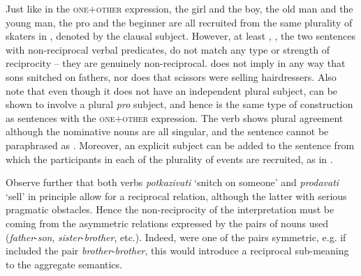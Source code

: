\documentclass[output=paper,colorlinks,citecolor=brown]{langscibook}
\begin{document}
\noindent Just like in the \textsc{one$+$other} expression, the girl and the boy, the old man and the young man, the pro and the beginner are all recruited from the same plurality of skaters in , denoted by the clausal subject. However, at least , , the two sentences with non-reciprocal verbal predicates, do not match any type or strength of reciprocity -- they are genuinely non-reciprocal.  does not imply in any way that sons snitched on fathers, nor does  that scissors were selling hairdressers. Also note that
even though it does not have an independent plural subject,  can be shown to involve a plural \textit{pro} subject, and hence is the same type of construction as sentences with the \textsc{one$+$other} expression. The verb shows plural agreement although the nominative nouns are all singular, and the sentence cannot be paraphrased as . Moreover, an explicit subject can be added to the sentence from which the participants in each of the plurality of events are recruited, as in .

\ea\label{ex:arsenijevic:Otac1}
\label{ex:arsenijevic:Otac1-a}
\label{ex:arsenijevic:Otac1-b}
\z \z

\noindent Observe further that both verbs \textit{potkazivati} `snitch on someone' and \textit{prodavati} `sell' in principle allow for a reciprocal relation, although the latter with serious pragmatic obstacles. Hence the non-reciprocity of the interpretation must be coming from the asymmetric relations expressed by the pairs of nouns used (\textit{father}-\textit{son}, \textit{sister}-\textit{brother}, etc.). Indeed, were one of the pairs symmetric, e.g. if  included the pair \textit{brother}-\textit{brother}, this would introduce a reciprocal sub-meaning to the aggregate semantics.
\end{document}
